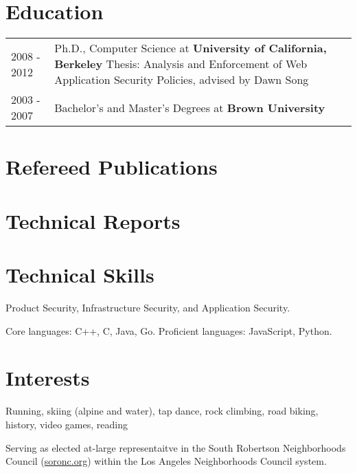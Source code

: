 \documentclass[a4paper,12pt]{article}
\begin{document}
\section{Education}
\begin{tabularx}{\linewidth}{@{}l X@{}}
2008 - 2012 & Ph.D., Computer Science at \textbf{University of California, Berkeley} \hfill \normalsize Thesis: Analysis and Enforcement of Web Application Security Policies, advised by Dawn Song \\

2003 - 2007 & Bachelor's and Master's Degrees at \textbf{Brown University} \\ 

\end{tabularx}

\section{Refereed Publications}
\begin{refsection}
\nocite{*}
\printbibliography[heading=none]
\end{refsection}

\section{Technical Reports}
\begin{refsection}
\nocite{*}
\printbibliography[heading=none]
\end{refsection}


\section{Technical Skills}
Product Security, Infrastructure Security, and Application Security.

Core languages: C++, C, Java, Go. Proficient languages: JavaScript, Python.

\section{Interests}
Running, skiing (alpine and water), tap dance, rock climbing, road biking, history, video games, reading

Serving as elected at-large representaitve in the South Robertson Neighborhoods Council (\href{https://www.soronc.org}{soronc.org}) within the Los Angeles Neighborhoods Council system.
\end{document}
